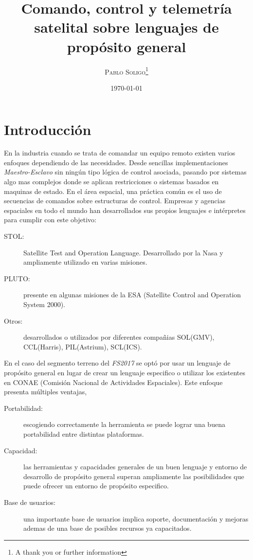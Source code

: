 \documentclass[twoside,twocolumn]{article}
\title{Comando, control y telemetría satelital sobre lenguajes de propósito general} %
\author{%
\textsc{Pablo Soligo}\thanks{A thank you or further information} \\[1ex] %
}
\date{\today} %
\begin{document}
\maketitle


\section{Introducción}

En la industria cuando se trata de comandar un equipo remoto existen varios 
enfoques dependiendo de las necesidades. Desde sencillas implementaciones 
\textit{Maestro-Esclavo} sin ningún tipo lógica de control asociada, pasando 
por sistemas algo mas complejos donde se aplican restricciones o sistemas 
basados en maquinas de estado. En el área espacial, una práctica común es el uso 
de secuencias de comandos sobre estructuras de control. Empresas y agencias 
espaciales en todo el mundo han desarrollados sus propios lenguajes e 
intérpretes para cumplir con este objetivo: 

\begin{description}
 \item [STOL:] Satellite Test and Operation Language. Desarrollado por la Nasa y ampliamente utilizado en varias misiones. 
 \item [PLUTO:] presente en algunas misiones de la ESA (Satellite Control and Operation System 2000).
 \item [Otros:] desarrollados o utilizados por diferentes compañias  SOL(GMV), CCL(Harris), PIL(Astrium), SCL(ICS). 
\end{description}

En el caso del segmento terreno del \textit{FS2017} se optó por usar un lenguaje 
de propósito general en lugar de crear un lenguaje especifico
o utilizar los existentes en CONAE (Comisión Nacional de Actividades Espaciales). Este enfoque presenta múltiples ventajas,

\begin{description}
 \item [Portabilidad: ] escogiendo correctamente la herramienta se puede lograr una buena portabilidad entre distintas plataformas.
 \item [Capacidad: ] las herramientas y capacidades generales de un buen lenguaje y entorno de desarrollo de propósito general superan ampliamente las posibilidades que puede ofrecer un entorno de propósito especifico.
 \item [Base de usuarios: ] una importante base de usuarios implica soporte, documentación y mejoras ademas de una base de posibles recursos ya capacitados. 
\end{description}
\end{document}
